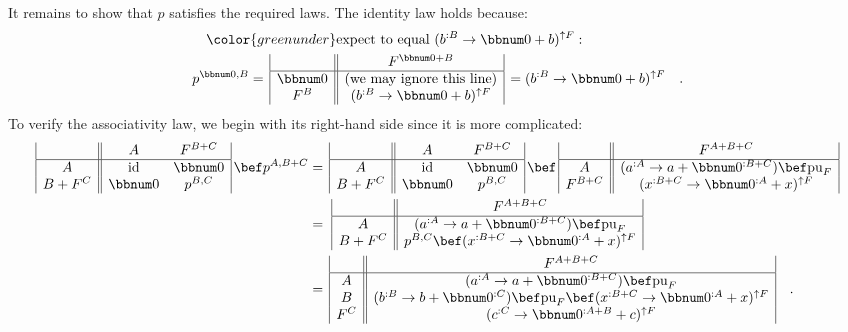 It remains to show that $p$ satisfies the required laws. The identity
law holds because:
\begin{align*}
 & \quad{\color{greenunder}\text{expect to equal }(b^{:B}\rightarrow\bbnum 0+b)^{\uparrow F}:}\quad\\
 & p^{\bbnum 0,B}=\,\begin{array}{|c||c|}
 & F^{\bbnum 0+B}\\
\hline \bbnum 0 & \text{(we may ignore this line)}\\
F^{B} & (b^{:B}\rightarrow\bbnum 0+b)^{\uparrow F}
\end{array}\,=(b^{:B}\rightarrow\bbnum 0+b)^{\uparrow F}\quad.
\end{align*}
To verify the associativity law, we begin with its right-hand side
since it is more complicated:
\begin{align*}
\begin{array}{|c||cc|}
 & A & F^{B+C}\\
\hline A & \text{id} & \bbnum 0\\
B+F^{C} & \bbnum 0 & p^{B,C}
\end{array}\,\bef p^{A,B+C} & =\,\begin{array}{|c||cc|}
 & A & F^{B+C}\\
\hline A & \text{id} & \bbnum 0\\
B+F^{C} & \bbnum 0 & p^{B,C}
\end{array}\,\bef\,\begin{array}{|c||c|}
 & F^{A+B+C}\\
\hline A & (a^{:A}\rightarrow a+\bbnum 0^{:B+C})\bef\text{pu}_{F}\\
F^{B+C} & (x^{:B+C}\rightarrow\bbnum 0^{:A}+x)^{\uparrow F}
\end{array}\\
 & =\,\,\begin{array}{|c||c|}
 & F^{A+B+C}\\
\hline A & (a^{:A}\rightarrow a+\bbnum 0^{:B+C})\bef\text{pu}_{F}\\
B+F^{C} & p^{B,C}\bef(x^{:B+C}\rightarrow\bbnum 0^{:A}+x)^{\uparrow F}
\end{array}\\
 & =\,\begin{array}{|c||c|}
 & F^{A+B+C}\\
\hline A & (a^{:A}\rightarrow a+\bbnum 0^{:B+C})\bef\text{pu}_{F}\\
B & (b^{:B}\rightarrow b+\bbnum 0^{:C})\bef\text{pu}_{F}\bef(x^{:B+C}\rightarrow\bbnum 0^{:A}+x)^{\uparrow F}\\
F^{C} & (c^{:C}\rightarrow\bbnum 0^{:A+B}+c)^{\uparrow F}
\end{array}\quad.
\end{align*}

